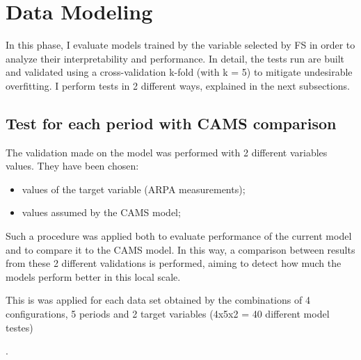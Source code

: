 \section{Data Modeling}
In this phase, I evaluate models trained by the variable selected by FS in order to analyze their interpretability and performance.
In detail, the tests run are built and validated using a cross-validation k-fold (with k = 5) to mitigate undesirable overfitting. 
I perform tests in 2 different ways, explained in the next subsections.
\subsection{Test for each period with CAMS comparison}
The validation made on the model was performed with 2 different variables values. They have been chosen:
\begin{itemize}
\item values of the target variable (ARPA measurements);
\item values assumed by the CAMS model;
\end{itemize}
Such a procedure was applied both to evaluate performance of the current model and to compare it to the CAMS model.
In this way, a comparison between results from these 2 different validations is performed, aiming to detect how much the models perform better in this local scale.\par
This is was applied for each data set obtained by the combinations of 4 configurations, 5 periods and 2 target variables (4x5x2 = 40 different model testes)
\par. 
